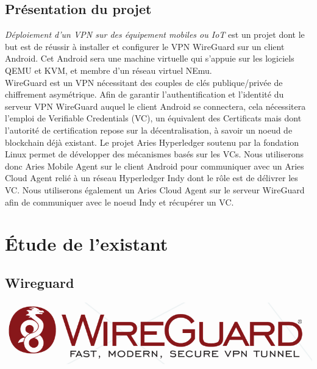 \documentclass[12pt, openany]{report}
\begin{document}
\subsection{Présentation du projet}
\noindent 
\begin{flushleft}
\textit{Déploiement d'un VPN sur des équipement mobiles ou IoT} est un projet dont le but est de réussir à installer et configurer le VPN WireGuard sur un client Android. Cet Android sera une machine virtuelle qui s'appuie sur les logiciels QEMU et KVM, et membre d'un réseau virtuel NEmu.\\
WireGuard est un VPN nécessitant des couples de clés publique/privée de chiffrement asymétrique. Afin de garantir l'authentification et l'identité du serveur VPN WireGuard auquel le client Android se connectera, cela nécessitera l'emploi de Verifiable Credentials (VC), un équivalent des Certificats mais dont l'autorité de certification repose sur la décentralisation, à savoir un noeud de blockchain déjà existant. Le projet Aries Hyperledger soutenu par la fondation Linux permet de développer des mécanismes basés sur les VCs. Nous utiliserons donc Aries Mobile Agent sur le client Android pour communiquer avec un Aries Cloud Agent relié à un réseau Hyperledger Indy dont le rôle est de délivrer les VC. Nous utiliserons également un Aries Cloud Agent sur le serveur WireGuard afin de communiquer avec le noeud Indy et récupérer un VC.
\end{flushleft}

\newpage
\section{Étude de l'existant}

\subsection{Wireguard}
\noindent 
\begin{center}
\includegraphics[width=\textwidth]{wg.png}
\end{center}
\end{document}
